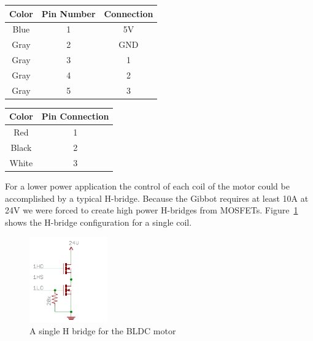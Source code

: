 \documentclass{article}
\begin{document}
\begin{table}
\centering
	\begin{subtable}[t]{0.4\textwidth}
		\label{motpin1}
		\centering
		\begin{tabular}{| c | c | c |}
			\hline
			\textbf{Color} & \textbf{Pin Number} & \textbf{Connection} \\ \hline
			Blue & 1 & 5V \\ \hline
			Gray & 2 & GND \\ \hline
			Gray & 3 & 1 \\ \hline
			Gray & 4 & 2 \\ \hline
			Gray & 5 & 3 \\ \hline
		\end{tabular}
	\end{subtable}
	\begin{subtable}[t]{0.4\textwidth}
		\label{motpin2}
		\centering
		\begin{tabular}{| c | c |}
			\hline
			\textbf{Color} & \textbf{Pin Connection} \\ \hline
			Red & 1  \\ \hline
			Black & 2 \\ \hline
			White & 3 \\ \hline
		\end{tabular}
	\end{subtable}
\end{table}


For a lower power application the control of each coil of the motor could be accomplished by a typical H-bridge. Because the Gibbot requires at least 10A at 24V we were forced to create high power H-bridges from MOSFETs.  Figure~\ref{fig:hbridge} shows the H-bridge configuration for a single coil. 
\begin{figure}[h]
	\centering
	\includegraphics[width=0.3\textwidth]{hbridge}
	\caption{A single H bridge for the BLDC motor}
	\label{fig:hbridge}
\end{figure}
\end{document}
